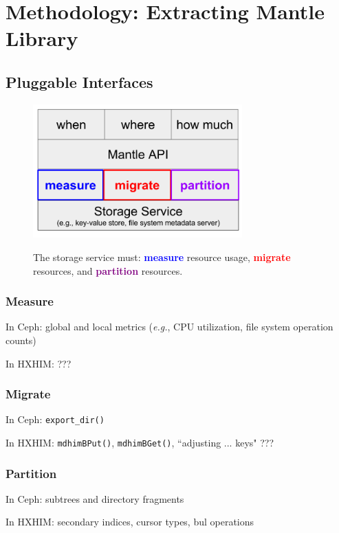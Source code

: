 \section{Methodology: Extracting Mantle Library}

\subsection{Pluggable Interfaces}

\begin{figure}[tb]
  \noindent\includegraphics[width=19pc,angle=0]{figures/mantle-pluggable-interfaces.png}\\
  \caption{The storage service must: \textcolor{blue}{\textbf{measure}}
  resource usage, \textcolor{red}{\textbf{migrate}} resources, and
  \textcolor{purple}{\textbf{partition}} resources. }
  \label{fig:mantle-pluggable-interfaces}
\end{figure}

\subsubsection{Measure}

In Ceph: global and local metrics ({\it e.g.}, CPU utilization, file system operation counts)

In HXHIM: ???

\subsubsection{Migrate}

In Ceph: \texttt{export\_dir()}

In HXHIM: \texttt{mdhimBPut()}, \texttt{mdhimBGet()}, ``adjusting ... keys" ???

\subsubsection{Partition}

In Ceph: subtrees and directory fragments

In HXHIM: secondary indices, cursor types, bul operations

